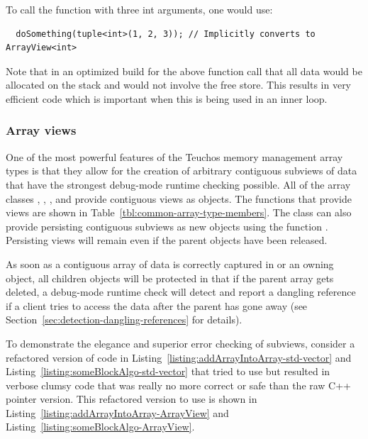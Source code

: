 \documentclass[pdf,ps2pdf,11pt]{SANDreport}
\begin{document}
To call the function with three int arguments, one would use:

{\small\begin{verbatim}
  doSomething(tuple<int>(1, 2, 3)); // Implicitly converts to ArrayView<int>
\end{verbatim}}

Note that in an optimized build for the above function call that all
data would be allocated on the stack and would not involve the free
store.  This results in very efficient code which is important when
this is being used in an inner loop.


%
{}\subsubsection{Array views}
\label{sec:array-views}
%

One of the most powerful features of the Teuchos memory management
array types is that they allow for the creation of arbitrary
contiguous subviews of data that have the strongest debug-mode runtime
checking possible.  All of the array classes {},
{}, {}, and {} provide contiguous
views as {} objects.  The functions that provide
{} views are shown in
Table~\ref{tbl:common-array-type-members}.  The {} class
can also provide persisting contiguous subviews as new
{} objects using the function
{}.  Persisting views will remain
even if the parent {} objects have been released.

As soon as a contiguous array of data is correctly captured in
{} or an owning {} object, all children
{} objects will be protected in that if the parent
array gets deleted, a debug-mode runtime check will detect and report
a dangling reference if a client tries to access the data after the
parent has gone away (see
Section~\ref{sec:detection-dangling-references} for details).

To demonstrate the elegance and superior error checking of
{} subviews, consider a refactored version of code in
Listing~\ref{listing:addArrayIntoArray-std-vector} and
Listing~\ref{listing:someBlockAlgo-std-vector} that tried to use
{} but resulted in verbose clumsy code that was
really no more correct or safe than the raw C++ pointer version.  This
refactored version to use {} is shown in
Listing~\ref{listing:addArrayIntoArray-ArrayView} and
Listing~\ref{listing:someBlockAlgo-ArrayView}.
\end{document}
